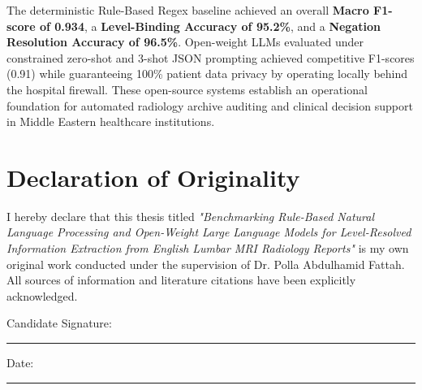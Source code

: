 \documentclass[12pt,a4paper,oneside]{report}
\begin{document}
The deterministic Rule-Based Regex baseline achieved an overall \textbf{Macro F1-score of 0.934}, a \textbf{Level-Binding Accuracy of 95.2\%}, and a \textbf{Negation Resolution Accuracy of 96.5\%}. Open-weight LLMs evaluated under constrained zero-shot and 3-shot JSON prompting achieved competitive F1-scores (0.91) while guaranteeing 100\% patient data privacy by operating locally behind the hospital firewall. These open-source systems establish an operational foundation for automated radiology archive auditing and clinical decision support in Middle Eastern healthcare institutions.

\newpage
\chapter*{Declaration of Originality}
I hereby declare that this thesis titled \textit{"Benchmarking Rule-Based Natural Language Processing and Open-Weight Large Language Models for Level-Resolved Information Extraction from English Lumbar MRI Radiology Reports"} is my own original work conducted under the supervision of Dr. Polla Abdulhamid Fattah. All sources of information and literature citations have been explicitly acknowledged.

\vspace{2cm}
\noindent Candidate Signature: \rule{6cm}{0.4pt} \hfill Date: \rule{4cm}{0.4pt}

\newpage
\tableofcontents

\newpage
\listoftables
{}

\newpage
\listoffigures
{}

\newpage
{}







\newpage


\end{document}
